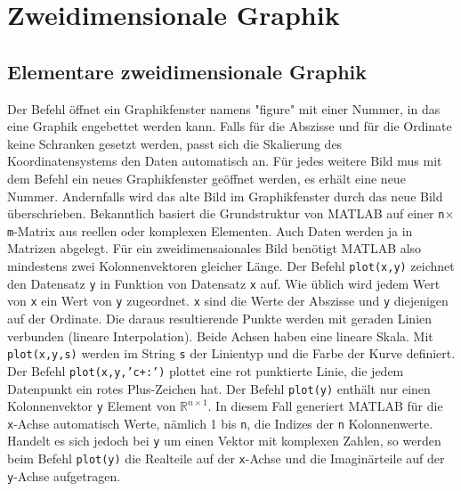 \section{Zweidimensionale Graphik}
\subsection{Elementare zweidimensionale Graphik}
Der Befehl  öffnet ein Graphikfenster namens "figure" mit einer Nummer, in das eine Graphik engebettet werden kann. Falls für die Abszisse und für die Ordinate keine Schranken gesetzt werden, passt sich die Skalierung des Koordinatensystems den Daten automatisch an. Für jedes weitere Bild mus mit dem Befehl  ein neues Graphikfenster geöffnet werden, es erhält eine neue Nummer. Andernfalls wird das alte Bild im Graphikfenster durch das neue Bild überschrieben. 
\newline\newline
Bekanntlich basiert die Grundstruktur von MATLAB auf einer \texttt{n$\times$m}-Matrix aus reellen oder komplexen Elementen. Auch Daten werden ja in Matrizen abgelegt. Für ein zweidimensaionales Bild benötigt MATLAB also mindestens zwei Kolonnenvektoren gleicher Länge.
\newline\newline
Der Befehl {\color{red}\texttt{plot(x,y)}} zeichnet den Datensatz \texttt{y} in Funktion von Datensatz \texttt{x} auf. Wie üblich wird jedem Wert von \texttt{x} ein Wert von \texttt{y} zugeordnet. \texttt{x} sind die Werte der Abszisse und \texttt{y} diejenigen auf der Ordinate. Die daraus resultierende Punkte werden mit geraden Linien verbunden (lineare Interpolation). Beide Achsen haben eine lineare Skala.
\newline\newline
Mit {\color{red}\texttt{plot(x,y,s)}} werden im String \texttt{s} der Linientyp und die Farbe der Kurve definiert. Der Befehl {\color{red}\texttt{plot(x,y,'c+:')}} plottet eine rot punktierte Linie, die jedem Datenpunkt ein rotes Plus-Zeichen hat. Der Befehl {\color{red}\texttt{plot(y)}} enthält nur einen Kolonnenvektor \texttt{y} Element von \texttt{$\mathbb{R}^{n\times 1}$}. In diesem Fall generiert MATLAB für die \texttt{x}-Achse automatisch Werte, nämlich 1 bis \texttt{n}, die Indizes der \texttt{n} Kolonnenwerte. 
\newline\newline
Handelt es sich jedoch bei \texttt{y} um einen Vektor mit komplexen Zahlen, so werden beim Befehl {\color{red}\texttt{plot(y)}} die Realteile auf der \texttt{x}-Achse und die Imaginärteile auf der \texttt{y}-Achse aufgetragen. 
